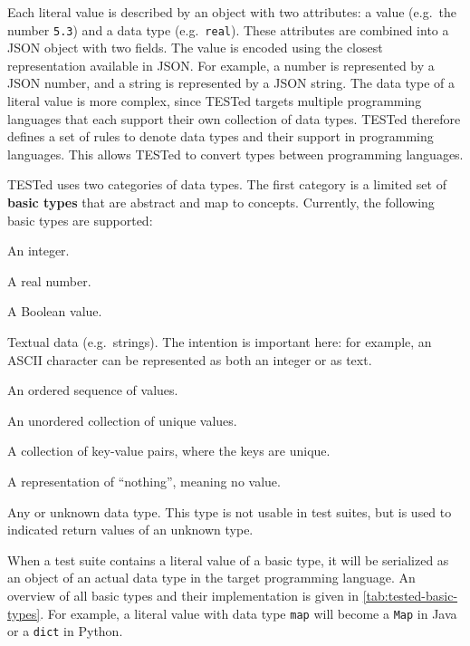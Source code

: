 \documentclass[../main]{subfiles}
\begin{document}
Each literal value is described by an object with two attributes: a value (e.g.\ the number \texttt{5.3}) and a data type (e.g.\ \texttt{real}).
These attributes are combined into a JSON object with two fields.
The value is encoded using the closest representation available in JSON\@.
For example, a number is represented by a JSON number, and a string is represented by a JSON string.
The data type of a literal value is more complex, since TESTed targets multiple programming languages that each support their own collection of data types.
TESTed therefore defines a set of rules to denote data types and their support in programming languages.
This allows TESTed to convert types between programming languages.

TESTed uses two categories of data types.
The first category is a limited set of \textbf{basic types} that are abstract and map to concepts.
Currently, the following basic types are supported:

\begin{description}[noitemsep]
    \item[\texttt{integer}] An integer.
    \item[\texttt{real}] A real number.
    \item[\texttt{boolean}] A Boolean value.
    \item[\texttt{text}] Textual data (e.g.\ strings).
          The intention is important here: for example, an \textsc{ASCII} character can be represented as both an integer or as text.
    \item[\texttt{sequence}] An ordered sequence of values.
    \item[\texttt{set}] An unordered collection of unique values.
    \item[\texttt{map}] A collection of key-value pairs, where the keys are unique.
    \item[\texttt{nothing}] A representation of ``nothing'', meaning no value.
    \item[\texttt{any}]  Any or unknown data type.
         This type is not usable in test suites, but is used to indicated return values of an unknown type.
\end{description}

When a test suite contains a literal value of a basic type, it will be serialized as an object of an actual data type in the target programming language.
An overview of all basic types and their implementation is given in \cref{tab:tested-basic-types}.
For example, a literal value with data type \texttt{map} will become a \texttt{Map} in Java or a \texttt{dict} in Python.
\end{document}
